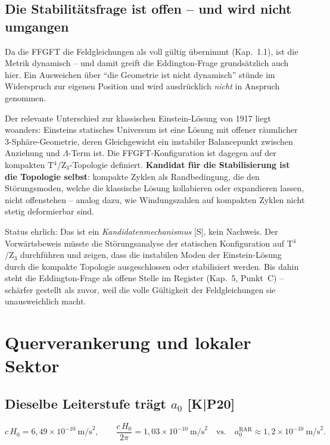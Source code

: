 \documentclass[11pt]{report}
\begin{document}
\section{Die Stabilitätsfrage ist offen -- und wird nicht umgangen}

Da die FFGFT die Feldgleichungen als voll gültig übernimmt
(Kap.~1.1), ist die Metrik dynamisch -- und damit greift die
Eddington-Frage grundsätzlich auch hier. Ein Ausweichen über
\enquote{die Geometrie ist nicht dynamisch} stünde im Widerspruch
zur eigenen Position und wird ausdrücklich \emph{nicht} in Anspruch
genommen.

Der relevante Unterschied zur klassischen Einstein-Lösung von 1917
liegt woanders: Einsteins statisches Universum ist eine Lösung mit
offener räumlicher 3-Sphäre-Geometrie, deren Gleichgewicht ein
instabiler Balancepunkt zwischen Anziehung und $\Lambda$-Term ist.
Die FFGFT-Konfiguration ist dagegen auf der kompakten
T$^4$/Z$_3$-Topologie definiert. \textbf{Kandidat für die
Stabilisierung ist die Topologie selbst}: kompakte Zyklen als
Randbedingung, die den Störungsmoden, welche die klassische Lösung
kollabieren oder expandieren lassen, nicht offenstehen -- analog
dazu, wie Windungszahlen auf kompakten Zyklen nicht stetig
deformierbar sind.

Status ehrlich: Das ist ein \emph{Kandidatenmechanismus} [S], kein
Nachweis. Der Vorwärtsbeweis müsste die Störungsanalyse der
statischen Konfiguration auf T$^4$/Z$_3$ durchführen und zeigen,
dass die instabilen Moden der Einstein-Lösung durch die kompakte
Topologie ausgeschlossen oder stabilisiert werden. Bis dahin steht
die Eddington-Frage als offene Stelle im Register (Kap.~5, Punkt~C)
-- schärfer gestellt als zuvor, weil die volle Gültigkeit der
Feldgleichungen sie unausweichlich macht.

\chapter{Querverankerung und lokaler Sektor}

\section{Dieselbe Leiterstufe trägt $a_0$ [K|P20]}

\[
  c\,H_0 = 6{,}49\times10^{-10}~\text{m/s}^2,
  \qquad
  \frac{c\,H_0}{2\pi} = 1{,}03\times10^{-10}~\text{m/s}^2
  \quad\text{vs.}\quad
  a_0^\text{RAR} \approx 1{,}2\times10^{-10}~\text{m/s}^2.
\]
\end{document}
